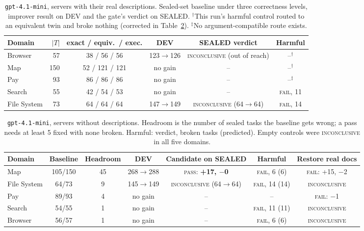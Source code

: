 \documentclass[11pt]{article}
\newcommand{\pass}{\textsc{pass}}
\newcommand{\fail}{\textsc{fail}}
\newcommand{\incon}{\textsc{inconclusive}}
\begin{document}
\begin{table}[t]
\centering\small
\caption{\texttt{gpt-4.1-mini}, servers with their real descriptions. Sealed-set baseline under three correctness levels, improver result on DEV and the
gate's verdict on SEALED. $^\dagger$This run's harmful control routed to an equivalent twin and broke nothing (corrected in
Table~\ref{tab:nodocs}). $^\ddagger$No argument-compatible route exists.}
\label{tab:full}
\begin{tabular}{lrcccc}
\toprule
Domain & $|T|$ & exact / equiv.\ / exec. & DEV & SEALED verdict & Harmful \\
\midrule
Browser     & 57  & 38 / 56 / 56  & 123$\to$126 & \incon{} (out of reach) & --$^\dagger$ \\
Map         & 150 & 52 / 121 / 121 & no gain    & --                & --$^\dagger$ \\
Pay         & 93  & 86 / 86 / 86  & no gain     & --                & --$^\ddagger$ \\
Search      & 55  & 42 / 54 / 53  & no gain     & --                & \fail, 11 \\
File System & 73  & 64 / 64 / 64  & 147$\to$149 & \incon{} (64$\to$64) & \fail, 14 \\
\bottomrule
\end{tabular}
\end{table}

\begin{table}[t]
\centering\small
\caption{\texttt{gpt-4.1-mini}, servers without descriptions. Headroom is the number of sealed tasks the baseline gets wrong; a pass needs at least 5
fixed with none broken. Harmful: verdict, broken tasks (predicted). Empty controls were \incon{} in all five domains.}
\label{tab:nodocs}
\begin{tabular}{lcccccc}
\toprule
Domain & Baseline & Headroom & DEV & Candidate on SEALED & Harmful & Restore real docs \\
\midrule
Map         & 105/150 & 45 & 268$\to$288 & \pass{}: \textbf{+17, $-$0} & \fail, 6 (6)  & \fail: +15, $-$2 \\
File System & 64/73   & 9  & 145$\to$149 & \incon{} (64$\to$64)       & \fail, 14 (14) & \incon \\
Pay         & 89/93   & 4  & no gain     & --                         & --             & \fail: $-$1 \\
Search      & 54/55   & 1  & no gain     & --                         & \fail, 11 (11) & \incon \\
Browser     & 56/57   & 1  & no gain     & --                         & \fail, 6 (6)   & \incon \\
\bottomrule
\end{tabular}
\end{table}
\end{document}
